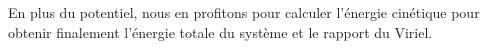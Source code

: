 		En plus du potentiel, nous en profitons pour calculer l'énergie cinétique pour obtenir finalement
		l'énergie totale du système et le rapport du Viriel.




